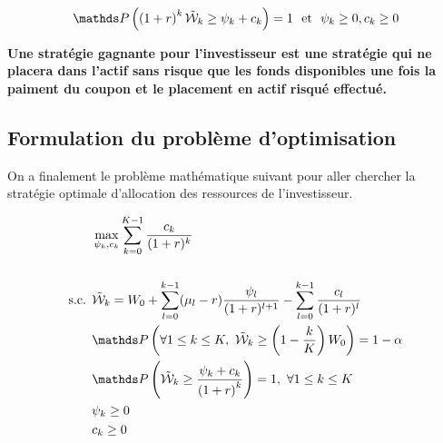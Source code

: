 \documentclass{article}
\numberwithin{equation}{section}
\begin{document}
\begin{equation}
\mathds P\left(\left(1 + r\right)^k\tilde\W_k\geq \psi_k + c_k\right) = 1\ \ \textnormal{et}\ \ \psi_k\geq0, c_k\geq 0
\end{equation}

\textbf{\color{awesomePurple}Une stratégie gagnante pour l'investisseur est une stratégie qui ne placera dans l'actif sans risque que les fonds disponibles une fois la paiment du coupon et le placement en actif risqué effectué.}


\subsection{Formulation du problème d'optimisation}

On a finalement le problème mathématique suivant pour aller chercher la stratégie optimale d'allocation des ressources de l'investisseur.

\begin{equation}
\begin{split}
&\max_{\psi_k, c_k}\sum_{k=0}^{K - 1} \frac{c_k}{(1 + r)^k}\\
\\
\textnormal{s.c. }&\tilde\W_k =  W_0 + \sum_{l=0}^{k - 1}(\mu_l - r) \frac{\psi_l}{(1 + r)^{l+1}} - \sum_{l=0}^{k - 1} \frac{c_l}{(1 + r)^l}\\
&\mathds P\left(\forall 1\leq k\leq K,\ \tilde \W_k\geq \left( 1 - \frac{k}{K} \right)W_0\right) = 1 - \alpha\\
&\mathds P\left(\tilde\W_k\geq \frac{\psi_k + c_k}{\left(1 + r\right)^k}\right) = 1,\ \forall 1\leq k\leq K\\
&\psi_k\geq0\\
&c_k\geq 0
\end{split}
\end{equation}
\end{document}
